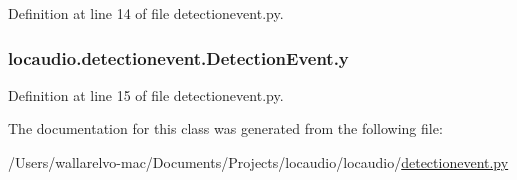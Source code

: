 Definition at line 14 of file detectionevent.\-py.

\hypertarget{classlocaudio_1_1detectionevent_1_1DetectionEvent_aab867d871d3ab2bc608936ab64051b56}{
\subsubsection[{y}]{\setlength{\rightskip}{0pt plus 5cm}locaudio.\-detectionevent.\-Detection\-Event.\-y}}\label{classlocaudio_1_1detectionevent_1_1DetectionEvent_aab867d871d3ab2bc608936ab64051b56}


Definition at line 15 of file detectionevent.\-py.



The documentation for this class was generated from the following file\-:\begin{DoxyCompactItemize}
\item 
/\-Users/wallarelvo-\/mac/\-Documents/\-Projects/locaudio/locaudio/\hyperlink{detectionevent_8py}{detectionevent.\-py}\end{DoxyCompactItemize}
